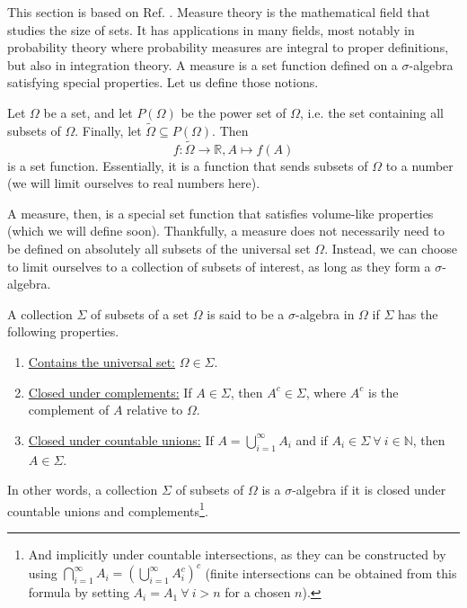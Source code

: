 \setcounter{equation}{0}

This section is based on Ref. \cite[pp. 8--16]{rudin_real_1987}. Measure theory is the mathematical field that studies the size of sets. It has applications in many fields, most notably in probability theory where probability measures are integral to proper definitions, but also in integration theory. A measure is a set function defined on a $\sigma$-algebra satisfying special properties. Let us define those notions.

\begin{appendix_definition} \label{def:set_function}
    Let $\Omega$ be a set, and let $P(\Omega)$ be the power set of $\Omega$, i.e. the set containing all subsets of $\Omega$. Finally, let $\tilde{\Omega} \subseteq P(\Omega)$. Then
    \begin{equation}
        f: \tilde{\Omega} \rightarrow \mathbb{R}, A \mapsto f(A)
    \end{equation}
    is a set function. Essentially, it is a function that sends subsets of $\Omega$ to a number (we will limit ourselves to real numbers here).
\end{appendix_definition}

A measure, then, is a special set function that satisfies volume-like properties (which we will define soon). Thankfully, a measure does not necessarily need to be defined on absolutely all subsets of the universal set $\Omega$. Instead, we can choose to limit ourselves to a collection of subsets of interest, as long as they form a $\sigma$-algebra.

\begin{appendix_definition} \label{def:sigma_algebra}
    A collection $\Sigma$ of subsets of a set $\Omega$ is said to be a $\sigma$-algebra in $\Omega$ if $\Sigma$ has the following properties.
    \begin{enumerate}
        \item \underline{Contains the universal set:} $\Omega \in \Sigma$.
        \item \underline{Closed under complements:} If $A \in \Sigma$, then $A^c \in \Sigma$, where $A^c$ is the complement of $A$ relative to $\Omega$.
        \item \underline{Closed under countable unions:} If $A = \bigcup\limits_{i = 1}^\infty A_i$ and if $A_i \in \Sigma \: \forall \: i \in \mathbb{N}$, then $A \in \Sigma$.
    \end{enumerate}
    In other words, a collection $\Sigma$ of subsets of $\Omega$ is a $\sigma$-algebra if it is closed under countable unions and complements\footnote{And implicitly under countable intersections, as they can be constructed by using $\bigcap\limits_{i = 1}^\infty A_i = \left(\bigcup\limits_{i = 1}^\infty A_i^c\right)^c$ (finite intersections can be obtained from this formula by setting $A_i = A_1 \: \forall \: i > n$ for a chosen $n$).}.
\end{appendix_definition}

